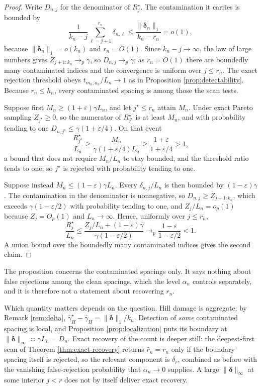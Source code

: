 \documentclass[11pt]{article}
\newcommand{\ghat}{\widehat{\gamma}}
\begin{document}
\begin{proof}
Write $D_{n,j}$ for the denominator of $R_j^\star$.  The contamination it
carries is bounded by
\[
  \frac1{k_n-j}\sum_{\ell=j+1}^{r_n}\delta_{n,\ell}
  \le
  \frac{\|\boldsymbol\delta_n\|_1}{k_n-r_n}
  =o(1),
\]
because $\|\boldsymbol\delta_n\|_1=o(k_n)$ and $r_n=O(1)$.  Since
$k_n-j\to\infty$, the law of large numbers gives
$\overline Z_{j+1:k_n}\to_p\gamma$, so $D_{n,j}\to_p\gamma$; as $r_n=O(1)$
there are boundedly many contaminated indices and the convergence is uniform
over $j\le r_n$.  The exact rejection threshold obeys $t_{m_n,a_n}/L_n\to1$ as
in Proposition \ref{prop:detectability}.  Because $r_n\le h_n$, every
contaminated spacing is among those the scan tests.

Suppose first $M_n\ge(1+\varepsilon)\gamma L_n$, and let $j^\star\le r_n$
attain $M_n$.  Under exact Pareto sampling $Z_{j^\star}\ge0$, so the numerator
of $R_{j^\star}^\star$ is at least $M_n$, and with probability tending to one
$D_{n,j^\star}\le\gamma(1+\varepsilon/4)$.  On that event
\[
  \frac{R_{j^\star}^\star}{L_n}
  \ge
  \frac{M_n}{\gamma(1+\varepsilon/4)L_n}
  \ge
  \frac{1+\varepsilon}{1+\varepsilon/4}
  >1,
\]
a bound that does not require $M_n/L_n$ to stay bounded, and the threshold ratio
tends to one, so $j^\star$ is rejected with probability tending to one.

Suppose instead $M_n\le(1-\varepsilon)\gamma L_n$.  Every
$\delta_{n,j}/L_n$ is then bounded by $(1-\varepsilon)\gamma$.  The
contamination in the denominator is nonnegative, so
$D_{n,j}\ge\overline Z_{j+1:k_n}$, which exceeds $\gamma(1-\varepsilon/2)$
with probability tending to one, and $Z_j/L_n=o_p(1)$ because $Z_j=O_p(1)$ and
$L_n\to\infty$.  Hence, uniformly over $j\le r_n$,
\[
  \frac{R_j^\star}{L_n}
  \le
  \frac{Z_j/L_n+(1-\varepsilon)\gamma}{\gamma(1-\varepsilon/2)}
  \longrightarrow_p
  \frac{1-\varepsilon}{1-\varepsilon/2}
  <1 .
\]
A union bound over the boundedly many contaminated indices gives the second
claim.
\end{proof}

The proposition concerns the contaminated spacings only.  It says nothing about
false rejections among the clean spacings, which the level $\alpha_n$ controls
separately, and it is therefore not a statement about recovering $r_n$.

Which quantity matters depends on the question.  Hill damage is aggregate: by Remark \ref{rem:delta},
$\ghat_H^\star-\ghat_H=\|\boldsymbol\delta\|_1/k_n$.  Detection of \emph{some}
contaminated spacing is local, and Proposition \ref{prop:localization} puts its
boundary at $\|\boldsymbol\delta\|_\infty\asymp\gamma L_n=D_n$.  Exact recovery
of the count is deeper still: the deepest-first scan of Theorem
\ref{thm:exact-recovery} returns $\widehat r_n=r_n$ only if the boundary
spacing itself is rejected, so the relevant component is $\delta_r$, combined
as before with the vanishing false-rejection probability that $\alpha_n\to0$
supplies.  A large $\|\boldsymbol\delta\|_\infty$ at some interior $j<r$ does
not by itself deliver exact recovery.
\end{document}
